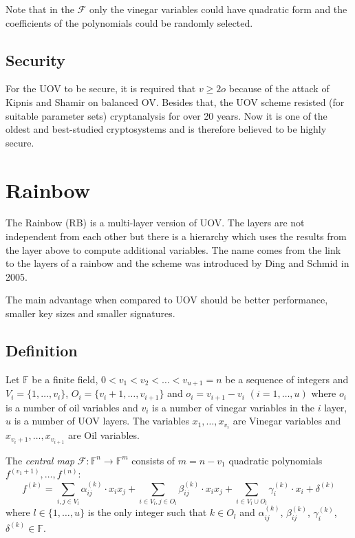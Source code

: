 \documentclass[thesis=M,english]{FITthesis}[2019/12/23]
\begin{document}
\bigskip
\noindent
Note that in the $\mathcal{F}$ only the vinegar variables could have quadratic form and the coefficients of the polynomials could be randomly selected.

\subsection{Security}
For the UOV to be secure, it is required that $v \geq 2o$ because of the attack of Kipnis and Shamir on balanced OV.\cite{L-KS98} Besides that, the UOV scheme resisted (for suitable parameter sets) cryptanalysis for over 20 years. Now it is one of the oldest and best-studied cryptosystems and is therefore believed to be highly secure.

\newpage
\section{Rainbow}
The Rainbow (RB) is a multi-layer version of UOV. The layers are not independent from each other but there is a hierarchy which uses the results from the layer above to compute additional variables. The name comes from the link to the layers of a rainbow and the scheme was introduced by Ding and Schmid in 2005.

\bigskip
\noindent
The main advantage when compared to UOV should be better performance, smaller key sizes and smaller signatures.

\subsection{Definition}\label{rb-definition}
Let $\mathbb{F}$ be a finite field, $0<v_1<v_2<\ldots<v_{u+1} = n$ be a sequence of integers and $V_i=\{1, \ldots, v_i\}$, $O_i=\{v_i+1, \ldots, v_{i+1}\}$ and $o_i = v_{i+1} - v_i \,\, (i=1,\ldots,u)$ where $o_i$ is a number of oil variables and $v_i$ is a number of vinegar variables in the $i$ layer, $u$ is a number of UOV layers. The variables $x_1, \ldots, x_{v_i}$ are Vinegar variables and $x_{v_{i}+1}, \ldots, x_{v_{i+1}}$ are Oil variables.

\bigskip
\noindent
The \textit{central map} $\mathcal{F}:\mathbb{F}^n \rightarrow \mathbb{F}^m$ consists of $m = n - v_1$ quadratic polynomials $f^{(v_1+1)}, \ldots, f^{(n)}$:
\[
f^{(k)} = \sum\limits_{i,j \in V_l}{\alpha_{ij}^{(k)} \cdot x_ix_j} + \sum\limits_{i \in V_l,j \in O_l}{\beta_{ij}^{(k)} \cdot x_ix_j}+ \sum\limits_{i \in V_l \cup O_l}{\gamma_{i}^{(k)} \cdot x_i} + \delta^{(k)}
\]
where $l \in \{1, \ldots, u\}$ is the only integer such that $k \in O_l$ and $\alpha_{ij}^{(k)}$, $\beta_{ij}^{(k)}$, $\gamma_{i}^{(k)}$, $\delta^{(k)} \in \mathbb{F}$.
\end{document}
